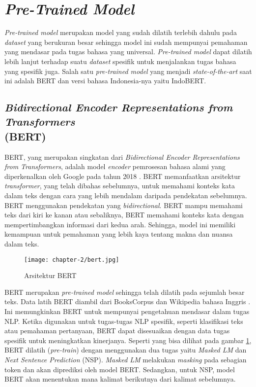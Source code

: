 \section{\textit{Pre-Trained Model}}

\textit{Pre-trained model} merupakan model yang sudah dilatih terlebih dahulu pada \textit{dataset} yang berukuran besar sehingga model ini sudah mempunyai pemahaman yang mendasar pada tugas bahasa yang universal. \textit{Pre-trained model} dapat dilatih lebih lanjut terhadap suatu \textit{dataset} spesifik untuk menjalankan tugas bahasa yang spesifik juga. Salah satu \textit{pre-trained model} yang menjadi \textit{state-of-the-art} saat ini adalah BERT dan versi bahasa Indonesia-nya yaitu IndoBERT. 

\subsection{\textit{Bidirectional Encoder Representations from Transformers} \\ (BERT)}
\label{sec:bert}

BERT, yang merupakan singkatan dari \textit{Bidirectional Encoder Representations from Transformers}, adalah model \textit{encoder} pemrosesan bahasa alami yang diperkenalkan oleh Google pada tahun 2018 \parencite{bert}. BERT memanfaatkan arsitektur \textit{transformer}, yang telah dibahas sebelumnya, untuk memahami konteks kata dalam teks dengan cara yang lebih mendalam daripada pendekatan sebelumnya. BERT menggunakan pendekatan yang \textit{bidirectional}. BERT mampu memahami teks dari kiri ke kanan atau sebaliknya, BERT memahami konteks kata dengan mempertimbangkan informasi dari kedua arah. Sehingga, model ini memiliki kemampuan untuk pemahaman yang lebih kaya tentang makna dan nuansa dalam teks.

\begin{figure}[ht]
    \vspace{0.25cm}
    \centering
    \texttt{[image: chapter-2/bert.jpg]}
    \caption{Arsitektur BERT \parencite{bert}}
    \label{fig:bert}
\end{figure}

BERT merupakan \textit{pre-trained model} sehingga telah dilatih pada sejumlah besar teks. Data latih BERT diambil dari BooksCorpus dan Wikipedia bahasa Inggris \parencite{bert}. Ini memungkinkan BERT untuk mempunyai pengetahuan mendasar dalam tugas NLP. Ketika digunakan untuk tugas-tugas NLP spesifik, seperti klasifikasi teks atau pemahaman pertanyaan, BERT dapat disesuaikan dengan data tugas spesifik untuk meningkatkan kinerjanya. Seperti yang bisa dilihat pada gambar \ref{fig:bert}, BERT dilatih (\textit{pre-train}) dengan menggunakan dua tugas yaitu \textit{Masked LM} dan \textit{Next Sentence Prediction} (NSP). \textit{Masked LM} melakukan \textit{masking} pada sebagian token dan akan diprediksi oleh model BERT. Sedangkan, untuk NSP, model BERT akan menentukan mana kalimat berikutnya dari kalimat sebelumnya.

